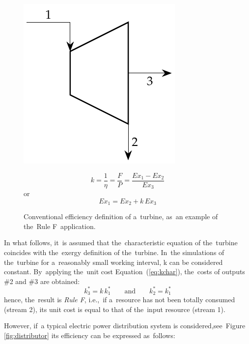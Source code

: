 \documentclass[energies,article,accept,moreauthors,pdftex]{Definitions/mdpi}
\begin{document}
\begin{figure}[H]
	\begin{minipage}[c]{0.50\linewidth}
		\centering
		\includegraphics[scale=0.7]{turbine}
	\end{minipage}
	\begin{minipage}[c]{0.48\linewidth}
		\centering
		\begin{equation*}
		k=\frac{1}{\eta}=\frac{F}{P}=\frac{Ex_1 - Ex_2}{Ex_3}
		\label{eq:turb}
		\end{equation*}
		or
		\begin{equation*}
		Ex_1=Ex_2+k\,Ex_3
		\end{equation*}
	\end{minipage}
	\caption{Conventional efficiency definition of a~turbine, as~an example of the~Rule F~application.}
	\label{fig:turbine}
\end{figure}

In what follows, it~is assumed that the~characteristic equation of the~turbine coincides with the~exergy definition of the~turbine. In~the simulations of the~turbine for a~reasonably small working interval, k can be considered constant. By~applying the~unit cost Equation~(\ref{eq:kchar}), the~costs of outputs \#2 and \#3 are obtained:
\begin{equation}
    k_3^*=k\,k_1^* \qquad\text{and}\qquad k_2^*=k_1^*
\end{equation}
hence, the~result is \emph{Rule F}, i.e.,~if a~resource has not been totally consumed (stream 2), its unit cost is equal to that of the~input resource (stream 1).

However, if~a typical electric power distribution system is considered,see~Figure~ \ref{fig:distributor} its efficiency can be expressed as~follows:
\end{document}
